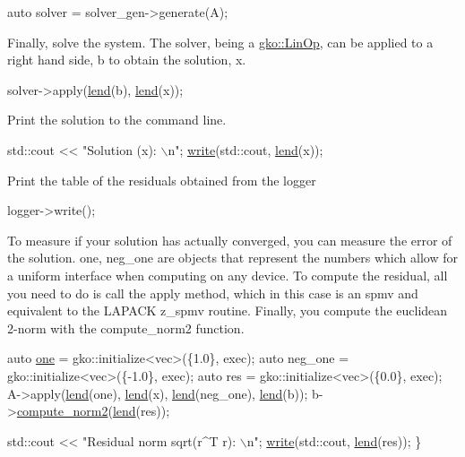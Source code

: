 \begin{DoxyCode}
\textcolor{keyword}{auto} solver = solver\_gen->generate(A);
\end{DoxyCode}


Finally, solve the system. The solver, being a \hyperlink{classgko_1_1LinOp}{gko\+::\+Lin\+Op}, can be applied to a right hand side, b to obtain the solution, x.


\begin{DoxyCode}
solver->apply(\hyperlink{namespacegko_aa8cb4876b72e5e1036ea9575443c439b}{lend}(b), \hyperlink{namespacegko_aa8cb4876b72e5e1036ea9575443c439b}{lend}(x));
\end{DoxyCode}


Print the solution to the command line.


\begin{DoxyCode}
std::cout << \textcolor{stringliteral}{"Solution (x): \(\backslash\)n"};
\hyperlink{namespacegko_a859dc47a462721d83728d91ab7fa2148}{write}(std::cout, \hyperlink{namespacegko_aa8cb4876b72e5e1036ea9575443c439b}{lend}(x));
\end{DoxyCode}


Print the table of the residuals obtained from the logger


\begin{DoxyCode}
logger->write();
\end{DoxyCode}


To measure if your solution has actually converged, you can measure the error of the solution. one, neg\+\_\+one are objects that represent the numbers which allow for a uniform interface when computing on any device. To compute the residual, all you need to do is call the apply method, which in this case is an spmv and equivalent to the L\+A\+P\+A\+CK z\+\_\+spmv routine. Finally, you compute the euclidean 2-\/norm with the compute\+\_\+norm2 function.


\begin{DoxyCode}
    \textcolor{keyword}{auto} \hyperlink{namespacegko_a0059e27f8f4bc348ff65c1e60caf47c8}{one} = gko::initialize<vec>(\{1.0\}, exec);
    \textcolor{keyword}{auto} neg\_one = gko::initialize<vec>(\{-1.0\}, exec);
    \textcolor{keyword}{auto} res = gko::initialize<vec>(\{0.0\}, exec);
    A->apply(\hyperlink{namespacegko_aa8cb4876b72e5e1036ea9575443c439b}{lend}(one), \hyperlink{namespacegko_aa8cb4876b72e5e1036ea9575443c439b}{lend}(x), \hyperlink{namespacegko_aa8cb4876b72e5e1036ea9575443c439b}{lend}(neg\_one), \hyperlink{namespacegko_aa8cb4876b72e5e1036ea9575443c439b}{lend}(b));
    b->\hyperlink{classgko_1_1matrix_1_1Dense_a97fd354c4a26814586cd256b5f0d7bea}{compute\_norm2}(\hyperlink{namespacegko_aa8cb4876b72e5e1036ea9575443c439b}{lend}(res));

    std::cout << \textcolor{stringliteral}{"Residual norm sqrt(r^T r): \(\backslash\)n"};
    \hyperlink{namespacegko_a859dc47a462721d83728d91ab7fa2148}{write}(std::cout, \hyperlink{namespacegko_aa8cb4876b72e5e1036ea9575443c439b}{lend}(res));
\}
\end{DoxyCode}
 \label{_Results}%
